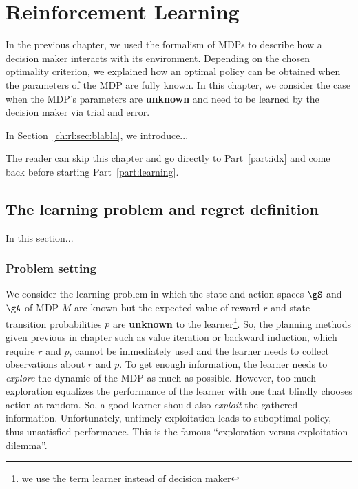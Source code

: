 \chapter{Reinforcement Learning}
\label{ch:rl_finite_horizon}

In the previous chapter, we used the formalism of MDPs to describe how a decision maker interacts with its environment.
Depending on the chosen optimality criterion, we explained how an optimal policy can be obtained when the parameters of the MDP are fully known.
In this chapter, we consider the case when the MDP's parameters are \textbf{unknown} and need to be learned by the decision maker via trial and error.

In Section~\ref{ch:rl:sec:blabla}, we introduce...

The reader can skip this chapter and go directly to Part~\ref{part:idx} and come back before starting Part~\ref{part:learning}.

\section{The learning problem and regret definition}

In this section...

\subsection{Problem setting}

We consider the learning problem in which the state and action spaces $\gS$ and $\gA$ of MDP $M$ are known but the expected value of reward $r$ and state transition probabilities $p$ are \textbf{unknown} to the learner\footnote{we use the term learner instead of decision maker}.
So, the planning methods given previous in chapter such as value iteration or backward induction, which require $r$ and $p$, cannot be immediately used and the learner needs to collect observations about $r$ and $p$.
To get enough information, the learner needs to \emph{explore} the dynamic of the MDP as much as possible.
However, too much exploration equalizes the performance of the learner with one that blindly chooses action at random.
So, a good learner should also \emph{exploit} the gathered information.
Unfortunately, untimely exploitation leads to suboptimal policy, thus unsatisfied performance. This is the famous “exploration versus exploitation dilemma”.

